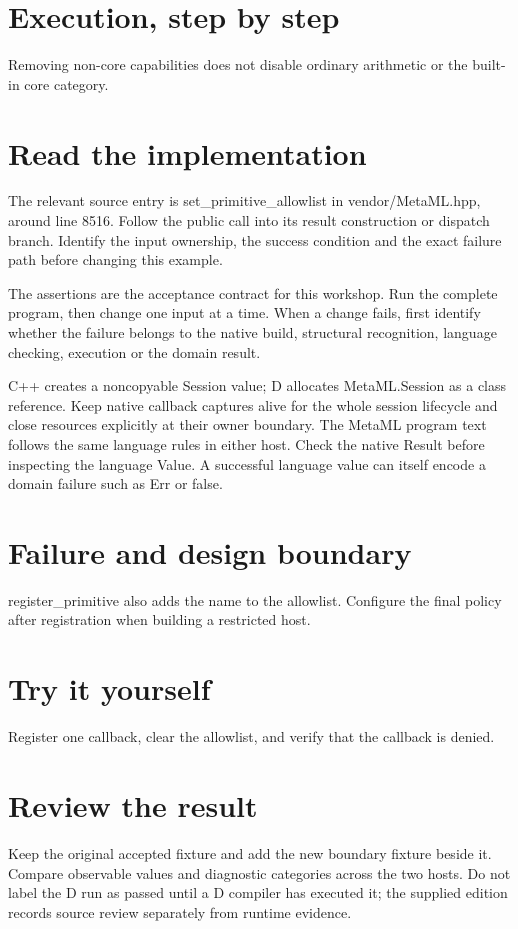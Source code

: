
\section*{Execution, step by step}
Removing non-core capabilities does not disable ordinary arithmetic or the built-in core category.

\section*{Read the implementation}
The relevant source entry is set\_primitive\_allowlist in vendor/MetaML.hpp, around line 8516. Follow the public call into its result construction or dispatch branch. Identify the input ownership, the success condition and the exact failure path before changing this example.

The assertions are the acceptance contract for this workshop. Run the complete program, then change one input at a time. When a change fails, first identify whether the failure belongs to the native build, structural recognition, language checking, execution or the domain result.

\clearpage
{}
C++ creates a noncopyable Session value; D allocates MetaML.Session as a class reference. Keep native callback captures alive for the whole session lifecycle and close resources explicitly at their owner boundary. The MetaML program text follows the same language rules in either host. Check the native Result before inspecting the language Value. A successful language value can itself encode a domain failure such as Err or false.


\section*{Failure and design boundary}
register\_primitive also adds the name to the allowlist. Configure the final policy after registration when building a restricted host.

\section*{Try it yourself}
Register one callback, clear the allowlist, and verify that the callback is denied.

\section*{Review the result}
Keep the original accepted fixture and add the new boundary fixture beside it. Compare observable values and diagnostic categories across the two hosts. Do not label the D run as passed until a D compiler has executed it; the supplied edition records source review separately from runtime evidence.


